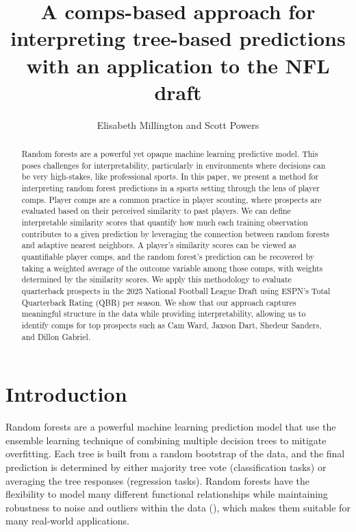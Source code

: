\documentclass[Review, sageh, times]{sagej}
\begin{document}
\title{A comps-based approach for interpreting tree-based predictions with an application to the NFL draft}

\author{Elisabeth Millington and Scott Powers}




\begin{abstract}
  Random forests are a powerful yet opaque machine learning predictive model. This poses challenges for interpretability, particularly in environments where decisions can be very high-stakes, like professional sports. In this paper, we present a method for interpreting random forest predictions in a sports setting through the lens of player comps. Player comps are a common practice in player scouting, where prospects are evaluated based on their perceived similarity to past players. We can define interpretable similarity scores that quantify how much each training observation contributes to a given prediction by leveraging the connection between random forests and adaptive nearest neighbors. A player's similarity scores can be viewed as quantifiable player comps, and the random forest's prediction can be recovered by taking a weighted average of the outcome variable among those comps, with weights determined by the similarity scores. We apply this methodology to evaluate quarterback prospects in the 2025 National Football League Draft using ESPN's Total Quarterback Rating (QBR) per season. We show that our approach captures meaningful structure in the data while providing interpretability, allowing us to identify comps for top prospects such as Cam Ward, Jaxson Dart, Shedeur Sanders, and Dillon Gabriel.
\end{abstract}


\maketitle

\section{Introduction}
Random forests are a powerful machine learning prediction model that use the ensemble learning technique of combining multiple decision trees to mitigate overfitting. Each tree is built from a random bootstrap of the data, and the final prediction is determined by either majority tree vote (classification tasks) or averaging the tree responses (regression tasks). Random forests have the flexibility to model many different functional relationships while maintaining robustness to noise and outliers within the data (\cite{breiman_random_2001}), which makes them suitable for many real-world applications.
\end{document}

